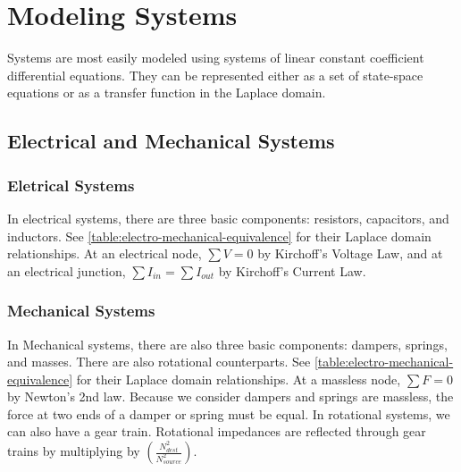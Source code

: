 \section{Modeling Systems}
Systems are most easily modeled using systems of linear constant coefficient differential equations.
They can be represented either as a set of state-space equations or as a transfer function in the Laplace domain.
\subsection{Electrical and Mechanical Systems}
\subsubsection{Eletrical Systems} 
In electrical systems, there are three basic components: resistors, capacitors, and inductors. See \cref{table:electro-mechanical-equivalence} for their Laplace domain relationships.
At an electrical node, $\sum V = 0$ by Kirchoff's Voltage Law, and at an electrical junction, $\sum I_{in} = \sum I_{out}$ by Kirchoff's Current Law.
\subsubsection{Mechanical Systems}
In Mechanical systems, there are also three basic components: dampers, springs, and masses. 
There are also rotational counterparts. See \cref{table:electro-mechanical-equivalence} for their Laplace domain relationships.
At a massless node, $\sum F=0$ by Newton's 2nd law.
Because we consider dampers and springs are massless, the force at two ends of a damper or spring must be equal.
In rotational systems, we can also have a gear train. Rotational impedances are reflected through gear trains by multiplying by $\left(\frac{N^2_{dest}}{N^2_{source}}\right)$.
